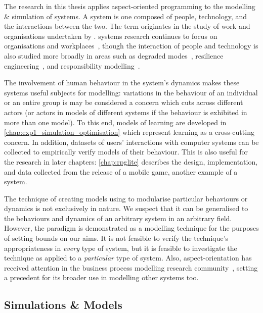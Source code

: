 The research in this thesis applies aspect-oriented programming to the modelling
\& simulation of \sociotechnical systems. A \sociotechnical system is one
composed of people, technology, and the interactions between the two. The
term originates in the study of work and organisations undertaken by
\citet{trist1951sociotechnical}. \Sociotechnical systems research continues to
focus on organisations and
workplaces~\cite{pasmore2019reflections,baxter2011socio}, though the interaction
of people and technology is also studied more broadly in areas such as degraded
modes~\cite{johnson2007degradedmodes}, resilience
engineering~\cite{hollnagel2006resilience}, and responsibility
modelling~\cite{lock2009responsibility}.

The involvement of human behaviour in the system's dynamics makes these systems
useful subjects for \aspectoriented{} modelling: variations in the behaviour of
an individual or an entire group is may be considered a concern which cuts
across different actors (or actors in models of different systems if the
behaviour is exhibited in more than one model). To this end, models of learning
are developed in \cref{chap:exp1_simulation_optimisation} which represent
learning as a cross-cutting concern. In addition, datasets of users'
interactions with computer systems can be collected to empirically verify
\sociotechnical{} models of their behaviour. This is also useful for the
research in later chapters: \cref{chap:rpglite} describes the design,
implementation, and data collected from the release of a mobile game, another
example of a \sociotechnical system.

The technique of creating models using \aspectorientation to modularise
particular behaviours or dynamics is not exclusively \sociotechnical in nature.
We suspect that it can be generalised to the behaviours and dynamics
of an arbitrary system in an arbitrary field. However, the paradigm is
demonstrated as a \sociotechnical modelling technique for the purposes of
setting bounds on our aims. It is not feasible to verify the
technique's appropriateness in \emph{every} type of system, but it is feasible to
investigate the technique as applied to a \emph{particular} type of system.
Also, aspect-orientation has received attention in the business process
modelling research
community~\cite{charfi2007ao4bpel,Cappelli_AOBPM,Charfi2006AspectOrientedWL},
setting a precedent for its broader use in modelling other \sociotechnical
systems too.


\subsection{Simulations \& Models}

